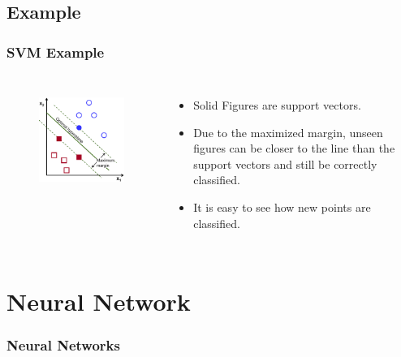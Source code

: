 \documentclass[mathserif]{beamer}
\begin{document}
	\subsection{Example}
	\begin{frame}
		\frametitle{SVM Example}
		\begin{columns}[t]
			\begin{figure}
				\centering
				\includegraphics[keepaspectratio,scale=2]{SVM.png} \\ \vspace{5px}
			\end{figure}
			
			\begin{itemize}
				\item Solid Figures are support vectors.
				\item Due to the maximized margin, unseen figures can be closer to the line than the support vectors and still be correctly classified.
				\item It is easy to see how new points are classified.
			\end{itemize}
		\end{columns}
	\end{frame}
	
	\section{Neural Network}
	\begin{frame}
		\frametitle{Neural Networks}
	\end{frame}
	
\end{document}

